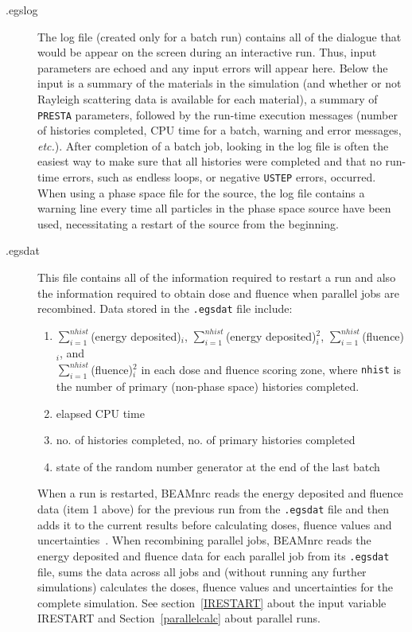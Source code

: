 \documentclass[12pt,twoside]{article}
\newcommand{\etc}{{\em etc.}}
\begin{document}
\begin{description}
\begin{description}
\end{description}

\item [.egslog]
The log file (created only for a batch run) contains all of the
dialogue that would be appear on the screen during an
interactive run.  Thus, input parameters are echoed and any input errors
will appear here.  Below the input is a summary of the materials in the
simulation (and
whether or not Rayleigh scattering data is available for each material),
a summary of \verb+PRESTA+ parameters, followed by the run-time execution
messages (number of histories completed, CPU time for a batch, warning
and error messages, \etc).
After completion of a batch job, looking in the log file
is often the easiest way to make sure that all histories were completed
and that no run-time errors, such as endless loops, or negative
\verb+USTEP+
errors, occurred.  When using a phase space file for the source,
the log file contains a warning
line every time all particles in the phase space source have been
used, necessitating a restart of the source from the beginning.

\item [.egsdat]
This file contains all of the information required to restart a run and
also the information required to obtain dose and fluence when parallel
jobs are recombined.  Data stored in the {\tt .egsdat}
file include:
\begin{enumerate}
\item $\sum_{i=1}^{nhist}$(energy deposited)$_i$,
      $\sum_{i=1}^{nhist}$(energy deposited)$^2_i$,
      $\sum_{i=1}^{nhist}$(fluence)$_i$, and\\
      $\sum_{i=1}^{nhist}$(fluence)$^2_i$ in each dose and fluence scoring
      zone, where {\tt nhist} is the number of primary (non-phase space)
      histories completed.
\item elapsed CPU time
\item no. of histories completed, no. of primary histories completed
\item state of the random number generator at the end of the last batch
\end{enumerate}
When a run is restarted, BEAMnrc reads the energy deposited and
fluence data (item 1 above) for the previous run from the {\tt .egsdat}
file and then adds it to the current results before calculating
doses, fluence values and uncertainties~\cite{Wa02a}.  When
recombining parallel jobs, BEAMnrc reads the energy deposited and
fluence data for each parallel job from its {\tt .egsdat} file,
sums the data across all jobs and
(without running any further simulations)
calculates the doses, fluence values and uncertainties
for the complete simulation.
See section~\ref{IRESTART} about the input variable IRESTART and
Section~\ref{parallelcalc} about parallel runs.


\end{description}
\end{document}

